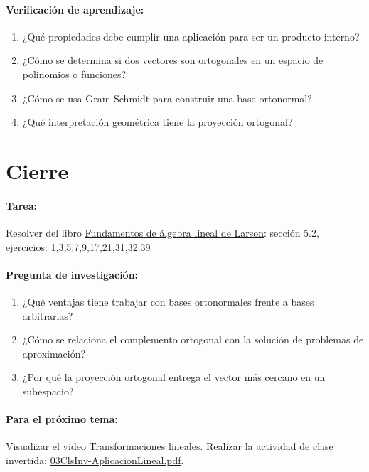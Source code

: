 \documentclass[a4,11pt]{aleph-notas}
\begin{document}
\paragraph{Verificación de aprendizaje:}
\begin{enumerate}[leftmargin=*]
    \item ¿Qué propiedades debe cumplir una aplicación para ser un producto interno?
    \item ¿Cómo se determina si dos vectores son ortogonales en un espacio de polinomios o funciones?
    \item ¿Cómo se usa Gram-Schmidt para construir una base ortonormal?
    \item ¿Qué interpretación geométrica tiene la proyección ortogonal?
\end{enumerate}

\section*{Cierre}

\paragraph{Tarea:}
Resolver del libro \href{https://catalogobiblioteca.puce.edu.ec/cgi-bin/koha/opac-detail.pl?biblionumber=86081}{Fundamentos de álgebra lineal de Larson}: sección 5.2, ejercicios: 1,3,5,7,9,17,21,31,32.39

\paragraph{Pregunta de investigación:}
\begin{enumerate}[leftmargin=*]
    \item ¿Qué ventajas tiene trabajar con bases ortonormales frente a bases arbitrarias?
    \item ¿Cómo se relaciona el complemento ortogonal con la solución de problemas de aproximación?
    \item ¿Por qué la proyección ortogonal entrega el vector más cercano en un subespacio?
\end{enumerate}

\paragraph{Para el próximo tema:}  
Visualizar el video \href{https://youtu.be/YJfS4_m_0Z8?si=kFS74G3kXhWGWq4L}{Transformaciones lineales}.
Realizar la actividad de clase invertida: \href{https://fcena-puce.github.io/AlgebraLineal-05-N0048/07Act-ClaseInvertida/03ClsInv-AplicacionLineal.pdf}{03ClsInv-AplicacionLineal.pdf}.
\end{document}

